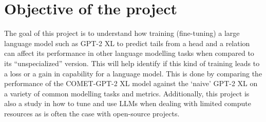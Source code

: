 \documentclass[\main/thesis.tex]{subfiles}
\begin{document}
\chapter{Objective of the project}

The goal of this project is to understand how training (fine-tuning) a large language model such as GPT-2 XL 
to predict tails from a head and a relation \cite{hwang_comet-atomic_2020} can affect its performance 
in other language modelling tasks when compared to its ``unspecialized'' version. This will help identify if this kind 
of training leads to a loss or a gain in capability for a language model.
This is done by comparing the performance of the COMET-GPT-2 XL\cite{west_symbolic_2021} model against the `naive' 
GPT-2 XL on a variety of common modelling tasks and metrics. Additionally, this project is also a study in how to tune and use 
LLMs when dealing with limited compute resources as is often the case with open-source projects. 
\end{document}

